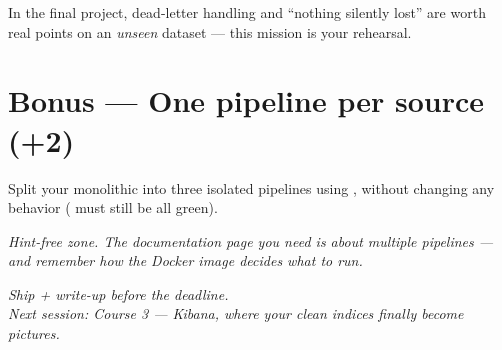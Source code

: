 \documentclass[11pt,a4paper]{article}
\begin{document}
\begin{whybox}
In the final project, dead-letter handling and ``nothing silently lost'' are
worth real points on an \emph{unseen} dataset — this mission is your rehearsal.
\end{whybox}

\section*{Bonus — One pipeline per source (+2)}

Split your monolithic  into three isolated pipelines using
, without changing any behavior ( must
still be all green).

\emph{Hint-free zone. The documentation page you need is about multiple
pipelines — and remember how the Docker image decides what to run.}

\bigskip
\begin{center}
\emph{Ship  + write-up before the deadline.\\
Next session: Course 3 — Kibana, where your clean indices finally become pictures.}
\end{center}
\end{document}
